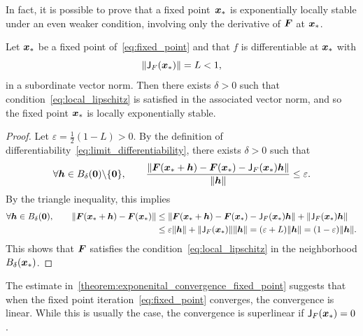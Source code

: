 In fact, it is possible to prove that a fixed point~$\mathbf{\boldsymbol{x}}_*$ is exponentially locally stable under an even weaker condition,
involving only the derivative of $\mathbf{\boldsymbol{F}}$ at $\mathbf{\boldsymbol{x}}_*$.
\begin{proposition}
    \label{proposition:local_convergence}
    Let $\mathbf{\boldsymbol{x}}_*$ be a fixed point of~\eqref{eq:fixed_point} and that $f$ is differentiable at $\mathbf{\boldsymbol{x}}_*$ with
    \[
        \lVert\mathsf J_F(\mathbf{\boldsymbol{x}}_*)\rVert = L < 1,
    \]
    in a subordinate vector norm.
    Then there exists $\delta > 0$ such that condition~\eqref{eq:local_lipschitz} is satisfied in the associated vector norm,
    and so the fixed point $\mathbf{\boldsymbol{x}}_*$ is locally exponentially stable.
\end{proposition}
\begin{proof}
    Let $\varepsilon = \frac{1}{2} (1-L) > 0$.
    By the definition of differentiability~\eqref{eq:limit_differentiability},
    there exists $\delta > 0$ such that
    \[
        \forall \mathbf{\boldsymbol{h}} \in B_{\delta} (\mathbf{\boldsymbol{0}}) \backslash \{ \mathbf{\boldsymbol{0}} \}, \qquad
        \frac{\lVert\mathbf{\boldsymbol{F}}(\mathbf{\boldsymbol{x}}_* + \mathbf{\boldsymbol{h}}) - \mathbf{\boldsymbol{F}}(\mathbf{\boldsymbol{x}}_*) - \mathsf J_F(\mathbf{\boldsymbol{x}}_*)\mathbf{\boldsymbol{h}}\rVert}{\lVert\mathbf{\boldsymbol{h}}\rVert} \leq \varepsilon.
    \]
    By the triangle inequality,
    this implies
    \begin{align*}
        \forall \mathbf{\boldsymbol{h}} \in B_{\delta} (\mathbf{\boldsymbol{0}}), \qquad
        \lVert\mathbf{\boldsymbol{F}}(\mathbf{\boldsymbol{x}}_* + \mathbf{\boldsymbol{h}}) - \mathbf{\boldsymbol{F}}(\mathbf{\boldsymbol{x}}_*)\rVert
        &\leq
        \lVert\mathbf{\boldsymbol{F}}(\mathbf{\boldsymbol{x}}_* + \mathbf{\boldsymbol{h}}) - \mathbf{\boldsymbol{F}}(\mathbf{\boldsymbol{x}}_*) - \mathsf J_F(\mathbf{\boldsymbol{x}}_*)\mathbf{\boldsymbol{h}}\rVert + \lVert\mathsf J_F(\mathbf{\boldsymbol{x}}_*)\mathbf{\boldsymbol{h}}\rVert \\
        &\leq
        \varepsilon \lVert\mathbf{\boldsymbol{h}}\rVert + \lVert\mathsf J_F(\mathbf{\boldsymbol{x}}_*)\rVert \lVert\mathbf{\boldsymbol{h}}\rVert
        = (\varepsilon + L) \lVert\mathbf{\boldsymbol{h}}\rVert = (1 - \varepsilon) \lVert\mathbf{\boldsymbol{h}}\rVert.
    \end{align*}
    This shows that $\mathbf{\boldsymbol{F}}$ satisfies the condition~\eqref{eq:local_lipschitz} in the neighborhood $B_{\delta}(\mathbf{\boldsymbol{x}}_*)$.
\end{proof}

The estimate in~\cref{theorem:exponenital_convergence_fixed_point} suggests that
when the fixed point iteration~\eqref{eq:fixed_point} converges,
the convergence is linear.
While this is usually the case,
the convergence is superlinear if $\mathsf J_F(\mathbf{\boldsymbol{x}}_*) = 0$.


